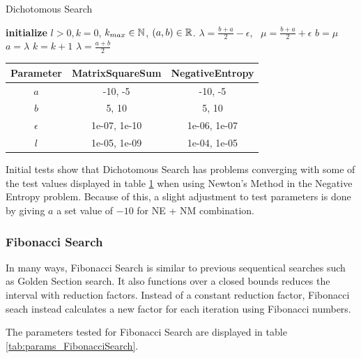 \documentclass[a4paper,english,titlepage,12pt]{article}
\newcommand{\R}{\ensuremath\mathbb{R}}
\newcommand{\N}{\ensuremath\mathbb{N}}
\begin{document}
\begin{algorithm}[H]
\caption{Dichotomous Search}
\label{alg_dichotomous}
\begin{algorithmic}[1]
\STATE \textbf{initialize} $l > 0, k = 0$, $k_{max} \in \N$, $(a, b) \in \R$.
    \STATE $\lambda = \frac{b + a}{2} - \epsilon$, \ $\mu = \frac{b + a}{2} + \epsilon$
    \IF{$\theta(\lambda) < \theta(\mu)$}
        \STATE $b = \mu$
    \ELSE
        \STATE $a = \lambda$
    \ENDIF
    \STATE $k = k + 1$
\ENDWHILE
\RETURN $\lambda = \frac{a + b}{2}$
\end{algorithmic}
\end{algorithm}

\begin{table}[H]
\label{tab:params_DichotomousSearch}
\centering
{}
\begin{tabular}{|c|c|c|}
\hline
\rowcolor{gray!25}
Parameter & MatrixSquareSum & NegativeEntropy \\
\hline
$a$ & -10, -5 & -10, -5 \\
$b$ & 5, 10 & 5, 10 \\
$\epsilon$ & 1e-07, 1e-10 & 1e-06, 1e-07 \\
$l$ & 1e-05, 1e-09 & 1e-04, 1e-05 \\
\hline
\end{tabular}
\end{table}

Initial tests show that Dichotomous Search has problems converging with some of the test values displayed in table \ref{tab:params_DichotomousSearch} when using Newton's Method in the Negative Entropy problem. Because of this, a slight adjustment to test parameters is done by giving $a$ a set value of $-10$ for NE + NM combination.


\subsubsection{Fibonacci Search}

In many ways, Fibonacci Search is similar to previous sequentical searches such as Golden Section search. It also functions over a closed bounds reduces the interval with reduction factors. Instead of a constant reduction factor, Fibonacci seach instead calculates a new factor for each iteration using Fibonacci numbers. \cite{book:nonlinear_programming}

The parameters tested for Fibonacci Search are displayed in table \ref{tab:params_FibonacciSearch}.
\end{document}
